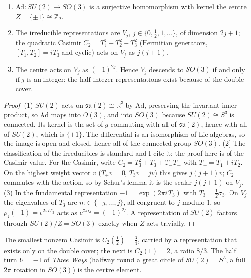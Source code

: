 \begin{proposition}\label{p1prop:su2}
\begin{enumerate}[nosep,leftmargin=1.4em]
\item $\mathrm{Ad}:SU(2)\to SO(3)$ is a surjective homomorphism with kernel the centre $Z=\{\pm1\}\cong\mathbb{Z}_2$.
\item The irreducible representations are $V_j$, $j\in\{0,\tfrac12,1,\dots\}$, of dimension $2j+1$; the quadratic
Casimir $C_2=T_1^2+T_2^2+T_3^2$ (Hermitian generators, $[T_1,T_2]=iT_3$ and cyclic) acts on $V_j$ as $j(j+1)$.
\item The centre acts on $V_j$ as $(-1)^{2j}$. Hence $V_j$ descends to $SO(3)$ if and only if $j$ is an integer: the
half-integer representations exist because of the double cover.
\end{enumerate}
\end{proposition}
\begin{proof}
(1) $SU(2)$ acts on $\mathfrak{su}(2)\cong\mathbb{R}^3$ by $\mathrm{Ad}$, preserving the invariant inner product, so
$\mathrm{Ad}$ maps into $O(3)$, and into $SO(3)$ because $SU(2)\cong S^3$ is connected. Its kernel is the set of $g$
commuting with all of $\mathfrak{su}(2)$, hence with all of $SU(2)$, which is $\{\pm1\}$. The differential is an
isomorphism of Lie algebras, so the image is open and closed, hence all of the connected group $SO(3)$.
(2) The classification of the irreducibles is standard and I cite it; the proof here is of the Casimir value. For the Casimir, write $C_2=T_3^2+T_3+T_-T_+$ with $T_\pm=T_1\pm iT_2$. On the highest
weight vector $v$ ($T_+v=0$, $T_3v=jv$) this gives $j(j+1)v$; $C_2$ commutes with the action, so by Schur's lemma it
is the scalar $j(j+1)$ on $V_j$.
(3) In the fundamental representation $-1=\exp(2\pi i\,T_3)$ with $T_3=\tfrac12\sigma_3$. On $V_j$ the eigenvalues of
$T_3$ are $m\in\{-j,\dots,j\}$, all congruent to $j$ modulo $1$, so $\rho_j(-1)=e^{2\pi i T_3}$ acts as $e^{2\pi ij}=(-1)^{2j}$.
A representation of $SU(2)$ factors through $SU(2)/Z=SO(3)$ exactly when $Z$ acts trivially.
\end{proof}

\noindent The smallest nonzero Casimir is $C_2(\tfrac12)=\tfrac34$, carried by a representation that exists only on the
double cover; the next is $C_2(1)=2$, a ratio $8/3$. The half turn $U=-1$ of \emph{Three Ways} (halfway round a great circle of $SU(2)=S^3$, a full $2\pi$ rotation in $SO(3)$) is the centre element.

